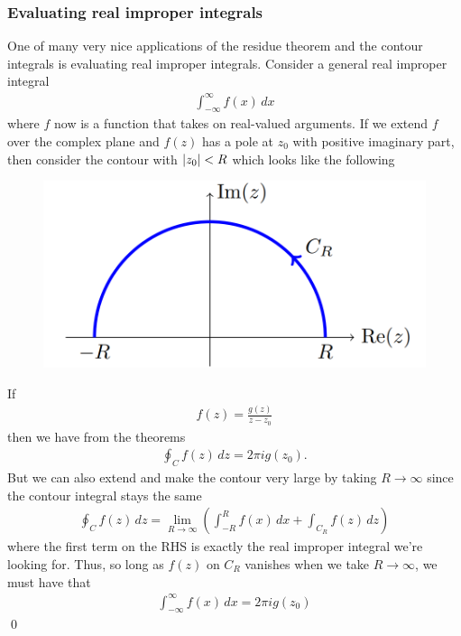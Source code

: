 \documentclass{book}
\theoremstyle{definition}
\newcommand{\f}[2]{\frac{#1}{#2}}
\newcommand{\lp}{\left(}
\newcommand{\rp}{\right)}
\begin{document}
\subsubsection{Evaluating real improper integrals}



One of many very nice applications of the residue theorem and the contour integrals is evaluating real improper integrals. Consider a general real improper integral 
\begin{align}
\int^{\infty}_{-\infty}f(x)\,dx
\end{align}
where $f$ now is a function that takes on real-valued arguments. If we extend $f$ over the complex plane and $f(z)$ has a pole at $z_0$ with positive imaginary part, then consider the contour with $\abs{z_0} < R$ which looks like the following
\begin{figure}
	\centering
	\includegraphics[scale=0.7]{improper}
\end{figure}
If 
\begin{align}
f(z) = \f{g(z)}{z - z_0}
\end{align}
then we have from the theorems
\begin{align}
\oint_C f(z)\,dz = 2\pi i g(z_0).
\end{align}
But we can also extend and make the contour very large by taking $R\to \infty$ since the contour integral stays the same
\begin{align}
\oint_C f(z)\,dz = \lim_{R\to \infty}\lp \int^R_{-R}f(x)\,dx + \int_{C_R}f(z)\,dz\rp
\end{align}
where the first term on the RHS is exactly the real improper integral we're looking for. Thus, so long as $f(z)$ on $C_R$ vanishes when we take $R\to \infty$, we must have that
\begin{align}
\boxed{\int^{\infty}_{-\infty}f(x)\,dx = 2\pi i g(z_0)}
\end{align}\qed
\end{document}
